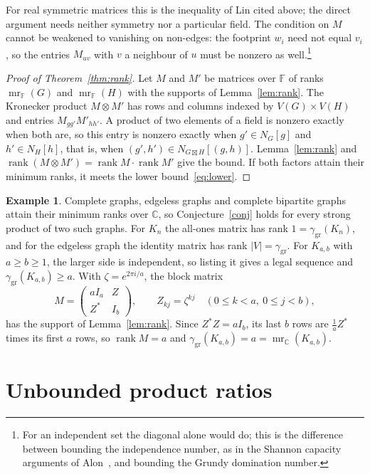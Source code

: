 \documentclass[11pt,a4paper,reqno]{amsart}
\theoremstyle{definition}
\newtheorem{example}[theorem]{Example}
\theoremstyle{remark}
\numberwithin{equation}{section}
\newcommand{\ggr}{\gamma_{\mathrm{gr}}}
\newcommand{\sprod}{\boxtimes}
\newcommand{\F}{\mathbb{F}}
\begin{document}
For real symmetric matrices this is the inequality of Lin cited above; the direct argument needs neither symmetry nor a particular field. The condition on $M$ cannot be weakened to vanishing on non-edges: the footprint $w_i$ need not equal $v_i$, so the entries $M_{uv}$ with $v$ a neighbour of $u$ must be nonzero as well.\footnote{For an independent set the diagonal alone would do; this is the difference between bounding the independence number, as in the Shannon capacity arguments of Alon~\cite{Alon}, and bounding the Grundy domination number.}

\begin{proof}[Proof of Theorem~\ref{thm:rank}]
Let $M$ and $M'$ be matrices over $\F$ of ranks $\operatorname{mr}_\F(G)$ and $\operatorname{mr}_\F(H)$ with the supports of Lemma~\ref{lem:rank}. The Kronecker product $M\otimes M'$ has rows and columns indexed by $V(G)\times V(H)$ and entries $M_{gg'}M'_{hh'}$. A product of two elements of a field is nonzero exactly when both are, so this entry is nonzero exactly when $g'\in N_G[g]$ and $h'\in N_H[h]$, that is, when $(g',h')\in N_{G\sprod H}[(g,h)]$. Lemma~\ref{lem:rank} and $\operatorname{rank}(M\otimes M')=\operatorname{rank}M\cdot\operatorname{rank}M'$ give the bound. If both factors attain their minimum ranks, it meets the lower bound~\eqref{eq:lower}.
\end{proof}

\begin{example}\label{ex:tight}
Complete graphs, edgeless graphs and complete bipartite graphs attain their minimum ranks over $\mathbb{C}$, so Conjecture~\ref{conj} holds for every strong product of two such graphs. For $K_n$ the all-ones matrix has rank $1=\ggr(K_n)$, and for the edgeless graph the identity matrix has rank $|V|=\ggr$. For $K_{a,b}$ with $a\ge b\ge1$, the larger side is independent, so listing it gives a legal sequence and $\ggr(K_{a,b})\ge a$. With $\zeta=e^{2\pi i/a}$, the block matrix
\[
 M=\begin{pmatrix} aI_a & Z\\ Z^\ast & I_b\end{pmatrix},\qquad Z_{kj}=\zeta^{kj}\quad(0\le k<a,\ 0\le j<b),
\]
has the support of Lemma~\ref{lem:rank}. Since $Z^\ast Z=aI_b$, its last $b$ rows are $\frac1a Z^\ast$ times its first $a$ rows, so $\operatorname{rank}M=a$ and $\ggr(K_{a,b})=a=\operatorname{mr}_{\mathbb C}(K_{a,b})$.
\end{example}

\section{Unbounded product ratios}\label{sec:unbounded}
\end{document}

